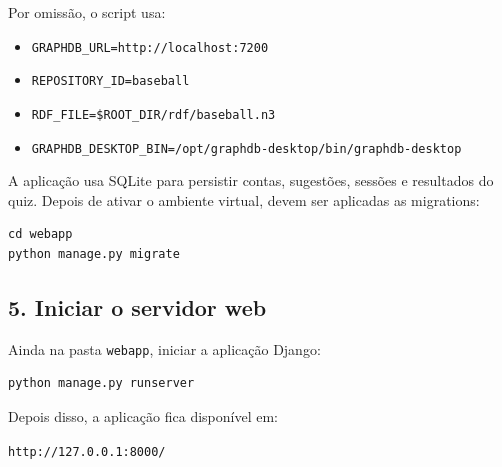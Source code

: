 Por omiss\~ao, o script usa:

\begin{itemize}[leftmargin=*]
  \item \texttt{GRAPHDB\_URL=http://localhost:7200}
  \item \texttt{REPOSITORY\_ID=baseball}
  \item \texttt{RDF\_FILE=\$ROOT\_DIR/rdf/baseball.n3}
  \item \texttt{GRAPHDB\_DESKTOP\_BIN=/opt/graphdb-desktop/bin/graphdb-desktop}
\end{itemize}

% 
% 

A aplica\c{c}\~ao usa SQLite para persistir contas, sugest\~oes, sess\~oes e resultados do quiz. Depois de ativar o ambiente virtual, devem ser aplicadas as migrations:

\begin{verbatim}
cd webapp
python manage.py migrate
\end{verbatim}

\subsection{5. Iniciar o servidor web}

Ainda na pasta \texttt{webapp}, iniciar a aplica\c{c}\~ao Django:

\begin{verbatim}
python manage.py runserver
\end{verbatim}

Depois disso, a aplica\c{c}\~ao fica dispon\'ivel em:

\begin{center}
\texttt{http://127.0.0.1:8000/}
\end{center}

